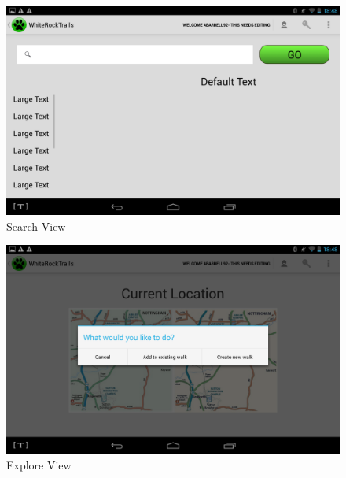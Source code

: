 \documentclass[11pt,a4paper]{article}
\begin{document}
\begin{appendices}
\begin{figure}[H]
\centering
\includegraphics[width=0.6\linewidth]{./img/search}
\caption{Search View}
\end{figure}

\begin{figure}[H]
\centering
\includegraphics[width=0.6\linewidth]{./img/explore}
\caption{Explore View}
\end{figure}
\end{appendices}

\newpage


\end{document}
